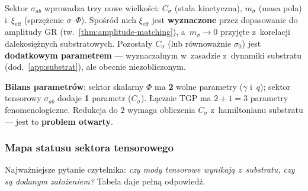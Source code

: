 \begin{remark}%
\label{rem:sigma-params}
Sektor $\sigma_{ab}$ wprowadza trzy nowe wielko\'sci:
$C_\sigma$ (sta\l{}a kinetyczna), $m_\sigma$ (masa pola)
i~$\xi_{\mathrm{eff}}$ (sprz\k{e}\.zenie $\sigma$--$\Phi$).
Spo\'sr\'od nich $\xi_{\mathrm{eff}}$ jest \textbf{wyznaczone}
przez dopasowanie do amplitudy GR
(tw.~\ref{thm:amplitude-matching}), a~$m_\sigma \to 0$
przyj\k{e}te z~korelacji dalekosi\k{e}\.znych substratowych.
Pozosta\l{}y $C_\sigma$ (lub r\'ownowa\.znie $\sigma_0$)
jest \textbf{dodatkowym parametrem} --- wyznaczalnym w~zasadzie
z~dynamiki substratu (dod.~\ref{app:substrat}), ale obecnie
niezobliczonym.

\medskip\noindent
\textbf{Bilans parametr\'ow}: sektor skalarny $\Phi$ ma
\textbf{2} wolne parametry ($\gamma$ i~$q$);
sektor tensorowy $\sigma_{ab}$ dodaje \textbf{1} parametr
($C_\sigma$). \L{}\k{a}cznie TGP ma $2+1 = 3$ parametry
fenomenologiczne. Redukcja do $2$ wymaga obliczenia $C_\sigma$
z~hamiltonianu substratu --- jest to \textbf{problem otwarty}.
\end{remark}

\subsubsection{Mapa statusu sektora tensorowego}\label{sssec:sigma-status-map}

\begin{remark}\label{rem:sigma-logic}
Najwa\.zniejsze pytanie czytelnika: \emph{czy mody tensorowe wynikaj\k{a}
z~substratu, czy s\k{a} dodanym za\l{}o\.zeniem?}
Tabela daje pe\l{}n\k{a} odpowied\'z.
\end{remark}

